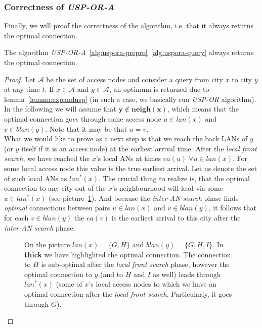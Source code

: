 	\subsubsection{Correctness of \textit{USP-OR-A}}
	
		\noindent Finally, we will proof the correctness of the algorithm, i.e. that it always returns the optimal connection.
		
		\begin{theorem}
			The algorithm \textit{USP-OR-A}~\ref{alg:uspora-prepro}~\ref{alg:uspora-query} always returns the optimal connection.
		\end{theorem}
		
		\begin{proof}
			Let $\mathcal{A}$ be the set of access nodes and consider a query from city $x$ to city $y$ at any time $t$. If $x \in \mathcal{A}$ and $y \in \mathcal{A}$, an optimum is returned due to lemma~\ref{lemma:expandusp} (in such a case, we basically run \textit{USP-OR} algorithm). \\
			
			\noindent In the following we will assume that $\bm{y \not \in neigh(x)}$, which means that the optimal connection goes through some access node $u \in lan(x)$ and $v \in blan(y)$. Note that it may be that $u = v$. \\
			
			\noindent What we would like to prove as a next step is that we reach the back LANs of $y$ (or $y$ itself if it is an access node) at the earliest arrival time. After the \textit{local front search}, we have reached the $x$'s local ANs at times $ea(u) \; \forall u \in lan(x)$. For some local access node this value is the true earliest arrival. Let us denote the set of such local ANs as $lan^{*}(x)$. The crucial thing to realize is, that the optimal connection to any city out of the $x$'s neighbourhood will lead via some $u \in lan^{*}(x)$ (see picture~\ref{fig:usporaproof2}). And because the \textit{inter-AN search} phase finds \textit{optimal} connections between pairs $u \in lan(x)$ and $v \in blan(y)$, it follows that for each $v \in blan(y)$ the $ea(v)$ is the earliest arrival to this city after the \textit{inter-AN search} phase.
			
			\begin{figure}[h!]
				\begin{center}
				\end{center}
				\caption{\label{fig:usporaproof2} On the picture $lan(x) = \{G, H\}$ and $blan(y) = \{G, H, I\}$. In \textbf{thick} we have highlighted the optimal connection. The connection to $H$ is sub-optimal after the \textit{local front search} phase, however the optimal connection to $y$ (and to $H$ and $I$ as well) leads through $lan^{*}(x)$ (some of $x$'s local access nodes to which we have an optimal connection after the \textit{local front search}. Particularly, it goes through $G$).}
			\end{figure}
			

\end{proof}
